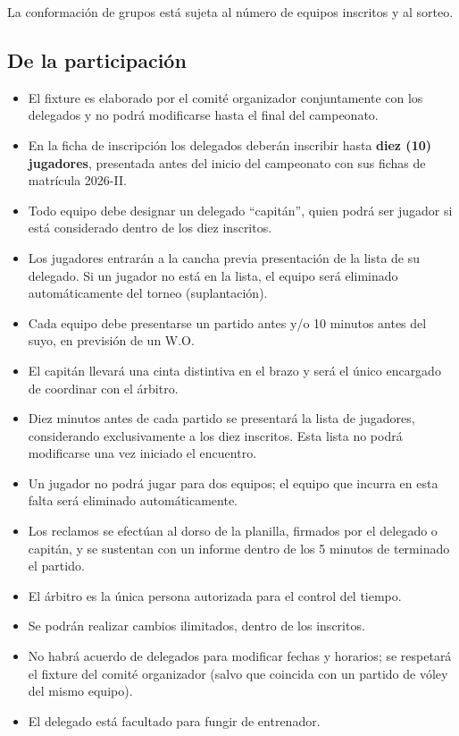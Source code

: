 	La conformación de grupos está sujeta al número de equipos inscritos y al sorteo.

	\subsection{De la participación}

	\begin{itemize}
		\item El fixture es elaborado por el comité organizador conjuntamente con los delegados y no podrá modificarse hasta el final del campeonato.
		\item En la ficha de inscripción los delegados deberán inscribir hasta \textbf{diez (10) jugadores}, presentada antes del inicio del campeonato con sus fichas de matrícula 2026-II.
		\item Todo equipo debe designar un delegado ``capitán'', quien podrá ser jugador si está considerado dentro de los diez inscritos.
		\item Los jugadores entrarán a la cancha previa presentación de la lista de su delegado. Si un jugador no está en la lista, el equipo será eliminado automáticamente del torneo (suplantación).
		\item Cada equipo debe presentarse un partido antes y/o 10 minutos antes del suyo, en previsión de un W.O.
		\item El capitán llevará una cinta distintiva en el brazo y será el único encargado de coordinar con el árbitro.
		\item Diez minutos antes de cada partido se presentará la lista de jugadores, considerando exclusivamente a los diez inscritos. Esta lista no podrá modificarse una vez iniciado el encuentro.
		\item Un jugador no podrá jugar para dos equipos; el equipo que incurra en esta falta será eliminado automáticamente.
		\item Los reclamos se efectúan al dorso de la planilla, firmados por el delegado o capitán, y se sustentan con un informe dentro de los 5 minutos de terminado el partido.
		\item El árbitro es la única persona autorizada para el control del tiempo.
		\item Se podrán realizar cambios ilimitados, dentro de los inscritos.
		\item No habrá acuerdo de delegados para modificar fechas y horarios; se respetará el fixture del comité organizador (salvo que coincida con un partido de vóley del mismo equipo).
		\item El delegado está facultado para fungir de entrenador.
	\end{itemize}


